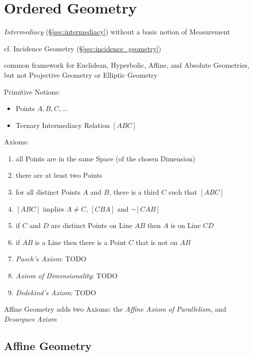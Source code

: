 \section{Ordered Geometry}\label{sec:ordered_geometry}

\emph{Intermediacy} (\S\ref{sec:intermediacy}) without a basic notion of
Measurement

\fist cf. Incidence Geometry (\S\ref{sec:incidence_geometry})

common framework for Euclidean, Hyperbolic, Affine, and Absolute Geometries, but
not Projective Geometry or Elliptic Geometry

Primitive Notions:
\begin{itemize}
  \item Points $A, B, C, \ldots$
  \item Ternary Intermediacy Relation $[ABC]$
\end{itemize}

Axioms:
\begin{enumerate}
  \item all Points are in the same Space (of the chosen Dimension)
  \item there are at least two Points
  \item for all distinct Points $A$ and $B$, there is a third $C$ such that
    $[ABC]$
  \item $[ABC]$ implies $A \neq C$, $[CBA]$ and $\neg[CAB]$
  \item if $C$ and $D$ are distinct Points on Line $AB$ then $A$ is on Line $CD$
  \item if $AB$ is a Line then there is a Point $C$ that is not on $AB$
  \item \emph{Pasch's Axiom}: TODO
  \item \emph{Axiom of Dimensionality}: TODO
  \item \emph{Dedekind's Axiom}: TODO
\end{enumerate}

Affine Geometry adds two Axioms: the \emph{Affine Axiom of Parallelism}, and
\emph{Desargues Axiom}



\subsection{Affine Geometry}\label{sec:affine_geometry}

